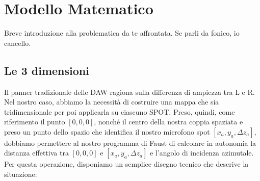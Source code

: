 \documentclass{article}
\begin{document}

\section{Modello Matematico}

Breve introduzione alla problematica da te affrontata. Se parli da fonico, io cancello.

    \subsection{Le 3 dimensioni}
    Il panner tradizionale delle DAW ragiona sulla differenza di ampiezza tra L e R. Nel nostro caso, abbiamo la necessità di costruire una mappa che sia tridimensionale per poi applicarla su ciascuno SPOT. Preso, quindi, come riferimento il punto $\left[0,0,0\right]$, nonché il centro della nostra coppia spaziata e preso un punto dello spazio che identifica il nostro microfono spot $\left[x_a,y_a,\Delta z_a\right]$, dobbiamo permettere al nostro programma di Faust di calcolare in autonomia la distanza effettiva tra $\left[0,0,0\right]$ e $\left[x_a,y_a,\Delta z_a\right]$ e l'angolo di incidenza azimutale. Per questa operazione, disponiamo un semplice disegno tecnico che descrive la situazione:
\end{document}
